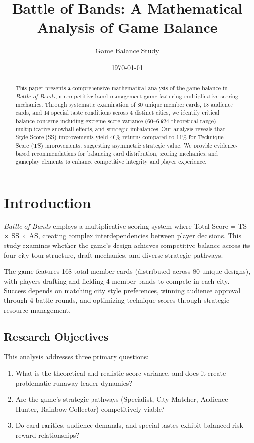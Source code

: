 \documentclass[11pt,a4paper]{article}
\title{\textbf{Battle of Bands: A Mathematical Analysis of Game Balance}}
\author{Game Balance Study}
\date{\today}
\begin{document}
\maketitle

\begin{abstract}
This paper presents a comprehensive mathematical analysis of the game balance in \textit{Battle of Bands}, a competitive band management game featuring multiplicative scoring mechanics. Through systematic examination of 80 unique member cards, 18 audience cards, and 14 special taste conditions across 4 distinct cities, we identify critical balance concerns including extreme score variance (60--6,624 theoretical range), multiplicative snowball effects, and strategic imbalances. Our analysis reveals that Style Score (SS) improvements yield 40\% returns compared to 11\% for Technique Score (TS) improvements, suggesting asymmetric strategic value. We provide evidence-based recommendations for balancing card distribution, scoring mechanics, and gameplay elements to enhance competitive integrity and player experience.
\end{abstract}

\section{Introduction}

\textit{Battle of Bands} employs a multiplicative scoring system where Total Score = TS $\times$ SS $\times$ AS, creating complex interdependencies between player decisions. This study examines whether the game's design achieves competitive balance across its four-city tour structure, draft mechanics, and diverse strategic pathways.

The game features 168 total member cards (distributed across 80 unique designs), with players drafting and fielding 4-member bands to compete in each city. Success depends on matching city style preferences, winning audience approval through 4 battle rounds, and optimizing technique scores through strategic resource management.

\subsection{Research Objectives}

This analysis addresses three primary questions:

\begin{enumerate}[itemsep=0pt]
    \item What is the theoretical and realistic score variance, and does it create problematic runaway leader dynamics?
    \item Are the game's strategic pathways (Specialist, City Matcher, Audience Hunter, Rainbow Collector) competitively viable?
    \item Do card rarities, audience demands, and special tastes exhibit balanced risk-reward relationships?
\end{enumerate}
\end{document}
